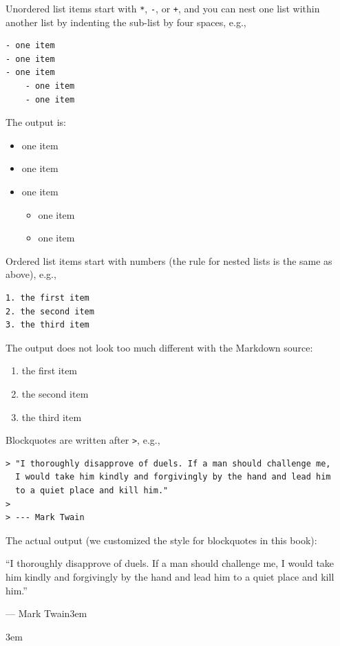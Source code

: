 \documentclass[doctor,openright,twoside]{sjtuthesis}
\def\VA#1#2{\addvspace{12pt}\raggedleft #1\rightskip3em\par #2\rightskip3em}
\renewenvironment{quote}
  {\list{}{\rightmargin\leftmargin}%
    \item\relax}
  {\endlist}
\providecommand{\tightlist}{%
    \setlength{\itemsep}{0pt}\setlength{\parskip}{0pt}}
\newcommand{\passthrough}[1]{#1}
\theoremstyle{plain}
\theoremstyle{definition}
\theoremstyle{remark}
\theoremstyle{ocrenumbox}
\theoremstyle{plain}
\begin{document}
Unordered list items start with \passthrough{\lstinline!*!},
\passthrough{\lstinline!-!}, or \passthrough{\lstinline!+!}, and you can
nest one list within another list by indenting the sub-list by four
spaces, e.g.,

\begin{lstlisting}
- one item
- one item
- one item
    - one item
    - one item
\end{lstlisting}

The output is:

\begin{itemize}
\tightlist
\item
  one item
\item
  one item
\item
  one item

  \begin{itemize}
  \tightlist
  \item
    one item
  \item
    one item
  \end{itemize}
\end{itemize}

Ordered list items start with numbers (the rule for nested lists is the
same as above), e.g.,

\begin{lstlisting}
1. the first item
2. the second item
3. the third item
\end{lstlisting}

The output does not look too much different with the Markdown source:

\begin{enumerate}
\def\labelenumi{\arabic{enumi}.}
\tightlist
\item
  the first item
\item
  the second item
\item
  the third item
\end{enumerate}

Blockquotes are written after \passthrough{\lstinline!>!}, e.g.,

\begin{lstlisting}
> "I thoroughly disapprove of duels. If a man should challenge me,
  I would take him kindly and forgivingly by the hand and lead him
  to a quiet place and kill him."
>
> --- Mark Twain
\end{lstlisting}

The actual output (we customized the style for blockquotes in this
book):

\begin{quote}
``I thoroughly disapprove of duels. If a man should challenge me, I
would take him kindly and forgivingly by the hand and lead him to a
quiet place and kill him.''

\VA{--- Mark Twain}{}
\end{quote}
\end{document}
